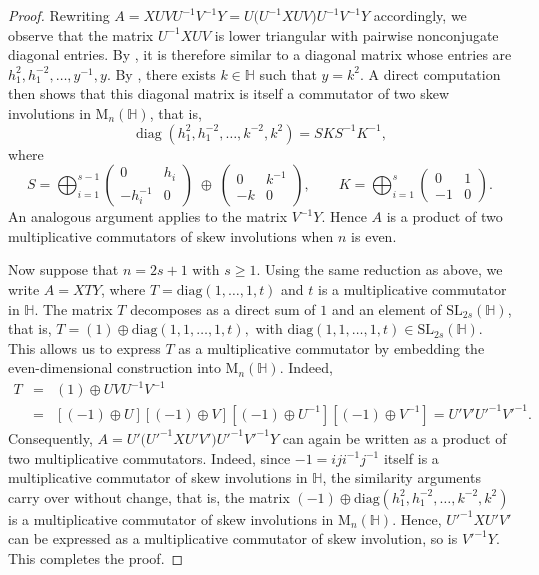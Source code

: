 \documentclass[11pt]{article}
\theoremstyle{definition}
\begin{document}
{{{{\begin{proof}
					Rewriting $A = XUVU^{-1}V^{-1}Y = U\big(U^{-1}XUV\big)U^{-1} V^{-1}Y$ accordingly, we observe that the matrix $U^{-1}XUV$ is lower triangular
					with pairwise nonconjugate diagonal entries. By \cite[Lemma~3.2]{Pa_BiDuHaSo_2022},
					it is therefore similar to a diagonal matrix whose entries are
					$h_1^2,h_1^{-2},\ldots,y^{-1},y$.
			By \cite[Lemma 14]{Pa_Ha_Nam_Son}, there exists $k\in\mathbb H$ such that $y=k^2$.
					A direct computation then shows that this diagonal matrix is itself a commutator of
					two skew involutions in $\mathrm{M}_n(\mathbb H)$, that is, $$ \operatorname{diag}(h_1^2, h_1^{-2}, \ldots, k^{-2}, k^2)= SKS^{-1}K^{-1},$$ where
					\[
					S=\bigoplus_{i=1}^{s-1}
					\begin{pmatrix}
						0 & h_i\\
						- h_i^{-1} & 0
					\end{pmatrix}
					\;\oplus\;
					\begin{pmatrix}
						0 & k^{-1}\\
						- k & 0
					\end{pmatrix},
					\qquad
					K=\bigoplus_{i=1}^{s}
					\begin{pmatrix}
						0 & 1\\
						-1 & 0
					\end{pmatrix}.
					\]
					An analogous argument applies to the matrix $V^{-1}Y$.
					Hence $A$ is a product of two multiplicative commutators of skew involutions when $n$ is even.
					
					Now suppose that $n=2s+1$ with $s\ge1$. Using the same reduction as above, we write
					$A=XTY$, where $T=\mathrm{diag}(1,\ldots,1,t)$ and $t$ is a multiplicative commutator in $\mathbb H$.
					The matrix $T$ decomposes as a direct sum of $1$ and an element of
					$\mathrm{SL}_{2s}(\mathbb H)$, that is, $T =(1) \oplus \mathrm{diag}(1,1,\ldots,1,t),$ with  $\mathrm{diag}(1,1,\ldots,1,t)\in \mathrm{SL}_{2s}(\mathbb{H})$. This allows us to express $T$ as a multiplicative commutator by
					embedding the even-dimensional construction into $\mathrm{M}_n(\mathbb H)$. Indeed, \begin{eqnarray*}
						T &=& (1) \oplus UVU^{-1}V^{-1} \\& =& [(-1)\oplus U][(-1) \oplus V][(-1) \oplus U^{-1}][(-1)\oplus V^{-1}] = U'V'U'^{-1}V'^{-1}.
					\end{eqnarray*}
					Consequently, $A =   U' \big(U'^{-1}X U'V'\big)U'^{-1}V'^{-1}Y$ can again be written as a product of two multiplicative commutators. Indeed, since $-1=iji^{-1}j^{-1}$ itself is a multiplicative commutator of skew involutions in $\mathbb{H}$, the similarity arguments carry
					over without change, that is, the matrix $(-1) \oplus  \mathrm{diag}(h_1^2,h_1^{-2},\ldots,k^{-2},k^2) $ is a multiplicative commutator of skew involutions in $\mathrm{M}_n(\mathbb{H})$. Hence, $U'^{-1} XU'V'$  can be expressed as a multiplicative commutator of skew involution, so is $V'^{-1}Y$. This completes the proof.
				\end{proof}
				
}}}}
\end{document}
